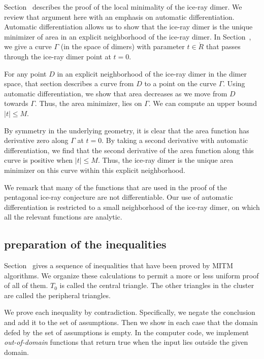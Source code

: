 Section~ describes the proof of the local minimality of the ice-ray dimer.  We review that
argument here with an emphasis on automatic differentiation.
Automatic differentiation allows us to show that the ice-ray dimer  is the unique minimizer of area
in an explicit neighborhood of the ice-ray dimer.  In Section~, we give a curve $\Gamma$ 
(in the space of dimers) with parameter $t\in\ring{R}$
that passes through the ice-ray dimer point at $t=0$.  

For any point $D$ in an explicit neighborhood of the ice-ray dimer in the dimer space, that section describes a curve from $D$ to a point
on the curve $\Gamma$.  
Using automatic differentiation, we show that area decreases as we move from $D$ towards $\Gamma$.
Thus, the area minimizer, lies on $\Gamma$.  We can compute an upper bound $|t|\le M$.

By symmetry in the underlying geometry, 
it is clear that the area function has derivative zero along $\Gamma$ at
$t=0$. By taking a second derivative with automatic differentiation, we find that the second derivative of
the area function along this curve is positive
when  $|t|\le M$.   Thus, the ice-ray dimer is the unique area minimizer on this curve within this explicit neighborhood.

We remark that many of the functions that are used in the proof of the pentagonal ice-ray conjecture are not
differentiable.  Our use of automatic differentiation is restricted to a small neighborhood of the ice-ray dimer, on
which all the relevant functions are analytic.

\subsection{preparation of the inequalities}

Section~ gives a sequence of inequalities that have been proved by MITM algorithms.
We organize these calculations to permit a more or less uniform proof of all of them.
$T_0$ is called the central triangle.  The other triangles in the cluster are called the peripheral triangles.

We prove each inequality by contradiction. Specifically, we negate the conclusion and add it to the
set of assumptions.  Then we show in each case that the domain defed by the set of assumptions is
empty. In the computer code, we implement {\it out-of-domain} functions that return true when the input
lies outside the given domain.

